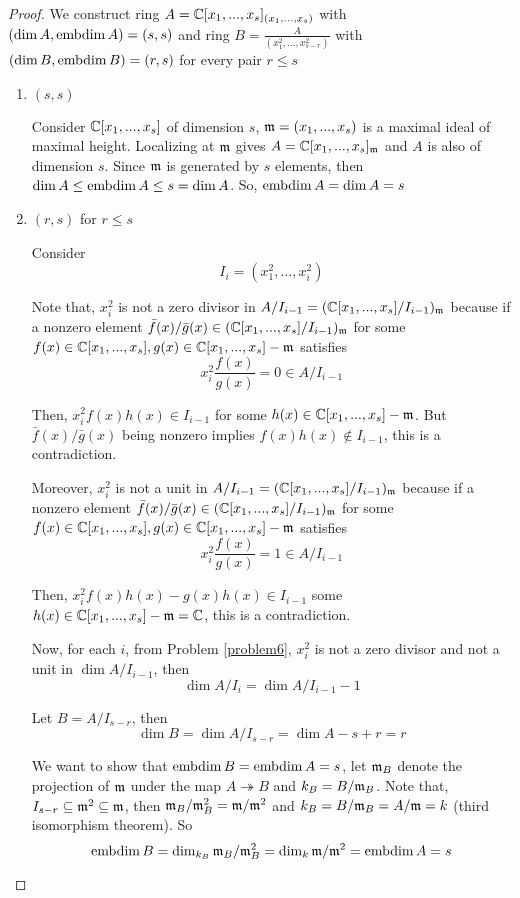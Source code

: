 \begin{proof}
	We construct ring $A = \mathbb{C}[x_1, ..., x_s]_{(x_1, ..., x_s)}$ with $(\dim A, \operatorname{embdim} A) = (s, s)$ and ring $B = \frac{A}{(x_1^2, ..., x_{s-r}^2)}$ with $(\dim B, \operatorname{embdim} B) = (r, s)$ for every pair $r \leq s$
	
	\begin{enumerate}
		\item $(s, s)$
		
		Consider $\mathbb{C}[x_1, ..., x_s]$ of dimension $s$, $\mathfrak{m} = (x_1 , ..., x_s)$ is a maximal ideal of maximal height. Localizing at $\mathfrak{m}$ gives $A = \mathbb{C}[x_1, ..., x_s]_{\mathfrak{m}}$ and $A$ is also of dimension $s$. Since $\mathfrak{m}$ is generated by $s$ elements, then $\dim A \leq \operatorname{embdim} A \leq s = \dim A$. So, $\operatorname{embdim} A = \dim A = s$
		
		\item $(r, s)$ for $r \leq s$
		
		Consider
		$$
			I_i = (x_1^2, ..., x_i^2)
		$$
		
		Note that, $x_i^2$ is not a zero divisor in $A / I_{i-1} = (\mathbb{C}[x_1, ..., x_s] / I_{i-1})_{\mathfrak{m}}$ because if a nonzero element $\bar{f}(x) / \bar{g}(x) \in (\mathbb{C}[x_1, ..., x_s] / I_{i-1})_{\mathfrak{m}}$ for some $f(x) \in \mathbb{C}[x_1, ..., x_s], g(x) \in \mathbb{C}[x_1, ..., x_s] - \mathfrak{m}$ satisfies
		$$
			x_i^2 \frac{f(x)}{g(x)} = 0 \in A / I_{i-1}
		$$
		
		Then, $x_i^2 f(x) h(x) \in I_{i-1}$ for some $h(x) \in \mathbb{C}[x_1, ..., x_s] - \mathfrak{m}$. But $\bar{f}(x) / \bar{g}(x)$ being nonzero implies $f(x) h(x) \notin I_{i-1}$, this is a contradiction.
		
		Moreover, $x_i^2$ is not a unit in $A / I_{i-1} = (\mathbb{C}[x_1, ..., x_s] / I_{i-1})_{\mathfrak{m}}$ because if a nonzero element $\bar{f}(x) / \bar{g}(x) \in (\mathbb{C}[x_1, ..., x_s] / I_{i-1})_{\mathfrak{m}}$ for some $f(x) \in \mathbb{C}[x_1, ..., x_s], g(x) \in \mathbb{C}[x_1, ..., x_s] - \mathfrak{m}$ satisfies
		$$
		x_i^2 \frac{f(x)}{g(x)} = 1 \in A / I_{i-1}
		$$
		
		Then, $x_i^2 f(x) h(x) - g(x) h(x) \in I_{i-1}$ some $h(x) \in \mathbb{C}[x_1, ..., x_s] - \mathfrak{m} = \mathbb{C}$, this is a contradiction.
		
		Now, for each $i$, from Problem \ref{problem6}, $x_i^2$ is not a zero divisor and not a unit in $\dim A / I_{i-1}$, then
		$$
			\dim A / I_i = \dim A / I_{i-1} - 1
		$$
		
		Let $B = A / I_{s-r}$, then
		$$
		\dim B = \dim A / I_{s-r} = \dim A - s + r = r
		$$
		
		We want to show that $\operatorname{embdim} B = \operatorname{embdim} A = s$, let $\mathfrak{m}_B$ denote the projection of $\mathfrak{m}$ under the map $A \twoheadrightarrow B$ and $k_B = B / \mathfrak{m}_B$. Note that, $I_{s-r} \subseteq \mathfrak{m}^2 \subseteq \mathfrak{m}$, then $\mathfrak{m}_B / \mathfrak{m}_B^2 = \mathfrak{m} / \mathfrak{m}^2$ and $k_B = B / \mathfrak{m}_B = A / \mathfrak{m} = k$ (third isomorphism theorem). So
		$$
			\operatorname{embdim} B = \dim_{k_B} \mathfrak{m}_B / \mathfrak{m}_B^2 = \dim_k \mathfrak{m} / \mathfrak{m}^2 = \operatorname{embdim} A = s
		$$
	\end{enumerate}
\end{proof}

